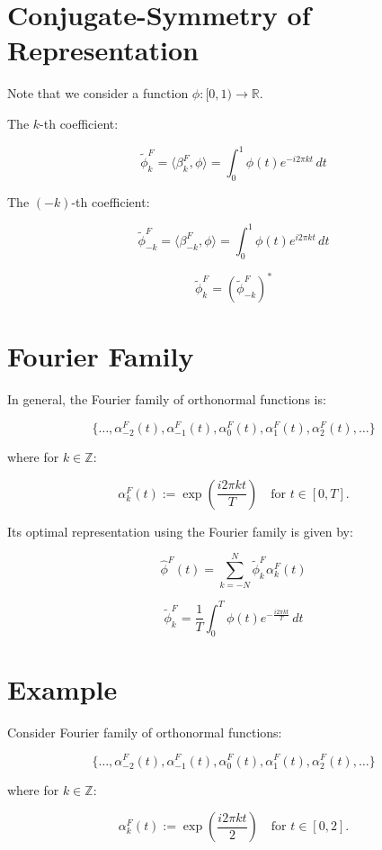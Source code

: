 \documentclass[12pt]{article}
\begin{document}
\newpage

\section{Conjugate-Symmetry of Representation}

Note that we consider a function \( \phi : [0,1) \rightarrow \mathbb{R} \).

The \( k \)-th coefficient:

\[
\tilde{\phi}_k^F = \langle \beta_k^F, \phi \rangle = \int_0^1 \phi(t) e^{-i2\pi kt} \, dt
\]

The \((-k)\)-th coefficient:

\[
\tilde{\phi}_{-k}^F = \langle \beta_{-k}^F, \phi \rangle = \int_0^1 \phi(t) e^{i2\pi kt} \, dt
\]

\[
\tilde{\phi}_k^F = (\tilde{\phi}_{-k}^F)^*
\]

\newpage

\section{Fourier Family}

In general, the Fourier family of orthonormal functions is:

\[
\{\ldots, \alpha_{-2}^F(t), \alpha_{-1}^F(t), \alpha_0^F(t), \alpha_1^F(t), \alpha_2^F(t), \ldots\}
\]

where for \( k \in \mathbb{Z} \):

\[
\alpha_k^F(t) := \exp\left(\frac{i2\pi kt}{T}\right) \quad \text{for } t \in [0,T].
\]

Its optimal representation using the Fourier family is given by:

\[
\hat{\phi}^F(t) = \sum_{k=-N}^{N} \tilde{\phi}_k^F \alpha_k^F(t)
\]

\[
\tilde{\phi}_k^F = \frac{1}{T} \int_0^T \phi(t) e^{-\frac{i2\pi kt}{T}} \, dt
\]

\newpage

\section{Example}

Consider Fourier family of orthonormal functions:

\[
\{\ldots, \alpha_{-2}^F(t), \alpha_{-1}^F(t), \alpha_0^F(t), \alpha_1^F(t), \alpha_2^F(t), \ldots\}
\]

where for \( k \in \mathbb{Z} \):

\[
\alpha_k^F(t) := \exp\left(\frac{i2\pi kt}{2}\right) \quad \text{for } t \in [0,2].
\]
\end{document}
